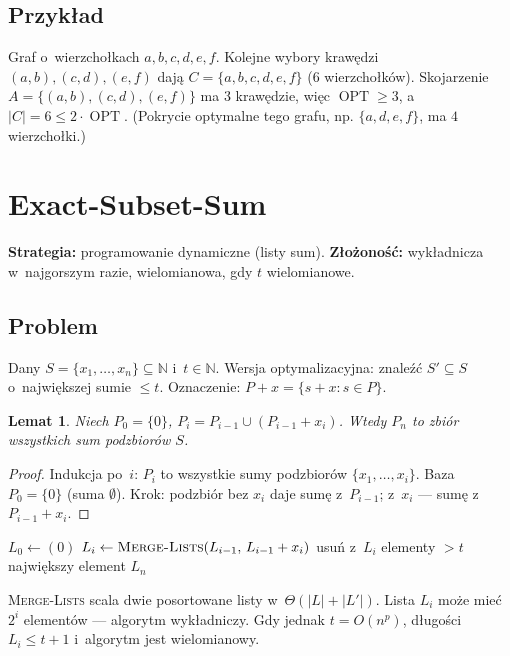 \documentclass[11pt,a4paper]{article}
\theoremstyle{plain}
\newtheorem{lemat}[twierdzenie]{Lemat}
\theoremstyle{definition}
\newcommand{\N}{\mathbb{N}}
\DeclareMathOperator{\OPT}{OPT}
\begin{document}
\subsection*{Przykład}
Graf o~wierzchołkach $a,b,c,d,e,f$. Kolejne wybory krawędzi $(a,b),(c,d),(e,f)$ dają
$C=\{a,b,c,d,e,f\}$ (6 wierzchołków). Skojarzenie $A=\{(a,b),(c,d),(e,f)\}$ ma $3$ krawędzie, więc
$\OPT\ge3$, a~$|C|=6\le2\cdot\OPT$. (Pokrycie optymalne tego grafu, np. $\{a,d,e,f\}$, ma $4$ wierzchołki.)

\section{Exact-Subset-Sum}\label{sec:exactss}
\textbf{Strategia:} programowanie dynamiczne (listy sum). \quad\textbf{Złożoność:} wykładnicza w~najgorszym razie,
wielomianowa, gdy $t$ wielomianowe.

\subsection*{Problem}
Dany $S=\{x_1,\dots,x_n\}\subseteq\N$ i~$t\in\N$. Wersja optymalizacyjna: znaleźć $S'\subseteq S$
o~największej sumie $\le t$. Oznaczenie: $P+x=\{s+x:s\in P\}$.

\begin{lemat}\label{lem:ss}
Niech $P_0=\{0\}$, $P_i=P_{i-1}\cup(P_{i-1}+x_i)$. Wtedy $P_n$ to zbiór wszystkich sum podzbiorów $S$.
\end{lemat}
\begin{proof}
Indukcja po~$i$: $P_i$ to wszystkie sumy podzbiorów $\{x_1,\dots,x_i\}$. Baza $P_0=\{0\}$ (suma $\emptyset$).
Krok: podzbiór bez $x_i$ daje sumę z~$P_{i-1}$; z~$x_i$ --- sumę z~$P_{i-1}+x_i$.
\end{proof}

\begin{algorithm}[H]
\caption{Exact-Subset-Sum($S,t$)}
\begin{algorithmic}[1]
\State $L_0\gets(0)$
  \State $L_i\gets\textsc{Merge-Lists}(L_{i-1},\,L_{i-1}+x_i)$ 
  \State usuń z~$L_i$ elementy $>t$
\EndFor
\State \Return największy element $L_n$
\end{algorithmic}
\end{algorithm}
\textsc{Merge-Lists} scala dwie posortowane listy w~$\Theta(|L|+|L'|)$. Lista $L_i$ może mieć $2^i$
elementów --- algorytm wykładniczy. Gdy jednak $t=O(n^p)$, długości $L_i\le t+1$ i~algorytm jest wielomianowy.
\end{document}
